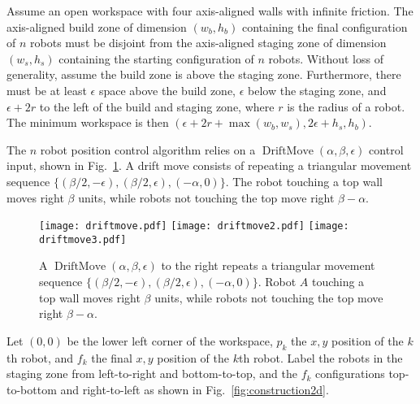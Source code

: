 Assume an open workspace with four axis-aligned walls with infinite friction.
The axis-aligned build zone of dimension $(w_b, h_b)$ containing the final configuration of $n$ robots must be disjoint from the axis-aligned staging zone of dimension $(w_s, h_s)$  containing the starting configuration of $n$ robots. Without loss of generality, assume the build zone  is above the staging zone. 
Furthermore, there must be at least $\epsilon$ space above the build zone, $\epsilon$ below the staging zone, and $\epsilon + 2r$ to the left of the build and staging zone, where $r$ is the radius of a robot.  The minimum workspace is then $(\epsilon + 2r + \max(w_b,w_s), 2\epsilon + h_s,h_b)$.

The $n$ robot position control algorithm relies on a $\operatorname{DriftMove}(\alpha, \beta, \epsilon)$ control input, shown in Fig.\  \ref{fig:driftmove}.
A drift move consists of repeating a triangular movement sequence $\{ (\beta/2,-\epsilon),(\beta/2,\epsilon),(-\alpha,0)\}$. The robot touching a top wall moves right $\beta$ units, while robots not touching the top move right $\beta-\alpha$.

\begin{figure}
\begin{center}
	\texttt{[image: driftmove.pdf]}
	\texttt{[image: driftmove2.pdf]}
	\texttt{[image: driftmove3.pdf]}
\end{center}
\vspace{-1em}
\caption{\label{fig:driftmove}
A  $\operatorname{DriftMove}(\alpha, \beta, \epsilon)$ to the right repeats a triangular movement sequence $\{ (\beta/2,-\epsilon),(\beta/2,\epsilon),(-\alpha,0)\}$. Robot $A$ touching a top wall moves right $\beta$ units, while robots not touching the top move right $\beta-\alpha$.}
\vspace{-1em}
\end{figure}

Let $(0,0)$ be the lower left corner of the workspace, $p_k$ the $x,y$ position of the $k$th robot, and $f_k$ the final $x,y$ position of the $k$th robot. Label the robots in the staging zone from left-to-right and bottom-to-top, and the $f_k$ configurations top-to-bottom and right-to-left as shown in Fig.~\ref{fig:construction2d}.

